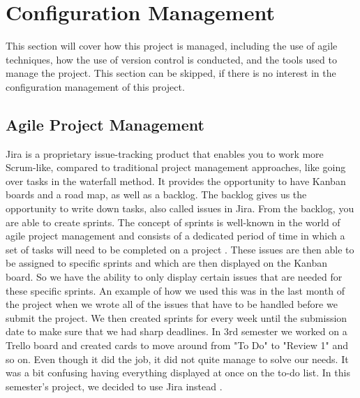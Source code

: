 \section{Configuration Management}
This section will cover how this project is managed, including the use of agile techniques, how the use of version control is conducted, and the tools used to manage the project. This section can be skipped, if there is no interest in the configuration management of this project. 

\subsection{Agile Project Management} \label{agileprojectmanagement}
Jira is a proprietary issue-tracking product that enables you to work more Scrum-like, compared to traditional project management approaches, like going over tasks in the waterfall method. It provides the opportunity to have Kanban boards and a road map, as well as a backlog. The backlog gives us the opportunity to write down tasks, also called issues in Jira. From the backlog, you are able to create sprints. The concept of sprints is well-known in the world of agile project management and consists of a dedicated period of time in which a set of tasks will need to be completed on a project \cite{AdobeProjectSprints}. These issues are then able to be assigned to specific sprints and which are then displayed on the Kanban board. So we have the ability to only display certain issues that are needed for these specific sprints. An example of how we used this was in the last month of the project when we wrote all of the issues that have to be handled before we submit the project. We then created sprints for every week until the submission date to make sure that we had sharp deadlines. In 3rd semester we worked on a Trello board and created cards to move around from "To Do" to "Review 1" and so on. Even though it did the job, it did not quite manage to solve our needs. It was a bit confusing having everything displayed at once on the to-do list. In this semester's project, we decided to use Jira instead \cite{jira}.


